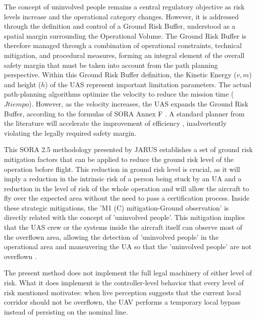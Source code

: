 \documentclass[journal,twoside,web]{ieeecolor}
\begin{document}
The concept of uninvolved people remains a central regulatory objective as risk levels increase and the operational category changes. However, it is addressed through the definition and control of a Ground Risk Buffer, understood as a spatial margin surrounding the Operational Volume. The Ground Risk Buffer is therefore managed through a combination of operational constraints, technical mitigation, and procedural measures, forming an integral element of the overall safety margin that must be taken into account from the path planning perspective. Within this Ground Risk Buffer definition, the Kinetic Energy ($v, m$) and height ($h$) of the UAS represent important limitation parameters. The actual path-planning algorithms optimize the velocity to reduce the mission time ($J{tiempo}$). However, as the velocity increases, the UAS expands the Ground Risk Buffer, according to the formulas of SORA Annex F \cite{JARUS_SORA_2_5_2024}. A standard planner from the literature will accelerate the improvement of efficiency \cite{dong2017efficient}, inadvertently violating the legally required safety margin.

This SORA 2.5 methodology presented by JARUS establishes a set of ground risk mitigation factors that can be applied to reduce the ground risk level of the operation before flight. This reduction in ground risk level is crucial, as it will imply a reduction in the intrinsic risk of a person being stuck by an UA and a reduction in the level of risk of the whole operation and will allow the aircraft to fly over the expected area without the need to pass a certification process.
Inside these strategic mitigations, the 'M1 (C) mitigation-Ground observation' is directly related with the concept of 'uninvolved people'. This mitigation implies that the UAS crew or the systems inside the aircraft itself can observe most of the overflown area, allowing the detection of 'uninvolved people' in the operational area and maneuvering the UA so that the 'uninvolved people' are not overflown \cite{EASA_AMC_GM_SORA25_2025}.

 The present method does not implement the full legal machinery of either level of risk. What it does implement is the controller-level behavior that every level of risk mentioned motivates: when live perception suggests that the current local corridor should not be overflown, the UAV performs a temporary local bypass instead of persisting on the nominal line.
\end{document}

